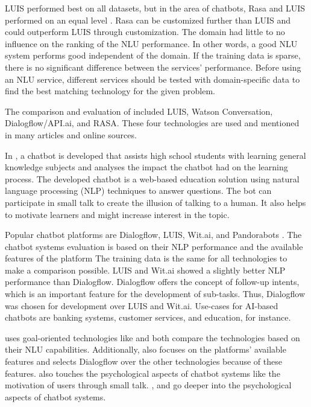 LUIS performed best on all datasets, but in the area of chatbots, Rasa and LUIS performed on an equal level \cite{braunEvaluatingNLU}.
Rasa can be customized further than LUIS and could outperform LUIS through customization. 
The domain had little to no influence on the ranking of the NLU performance.
In other words, a good NLU system performs good independent of the domain.
If the training data is sparse, there is no significant difference between the services' performance. 
Before using an NLU service, different services should be tested with domain-specific data to find the best matching technology for the given problem.

The comparison and evaluation of \citet{braunEvaluatingNLU} included LUIS, Watson Conversation, Dialogflow/API.ai, and RASA.
These four technologies are used and mentioned in many articles and online sources. 

In \citet{dutta2017developing}, a chatbot is developed that assists high school students with learning general knowledge subjects and analyses the impact the chatbot had on the learning process.
The developed chatbot is a web-based education solution using natural language processing (NLP) techniques to answer questions.
The bot can participate in small talk to create the illusion of talking to a human.
It also helps to motivate learners and might increase interest in the topic.

Popular chatbot platforms are Dialogflow, LUIS, Wit.ai, and Pandorabots \cite{dutta2017developing}.
The chatbot systems evaluation is based on their NLP performance and the available features of the platform
The training data is the same for all technologies to make a comparison possible. 
LUIS and Wit.ai showed a slightly better NLP performance than Dialogflow.
Dialogflow offers the concept of follow-up intents, which is an important feature for the development of sub-tasks.
Thus, Dialogflow was chosen for development over LUIS and Wit.ai.
Use-cases for AI-based chatbots are banking systems, customer services, and education, for instance.

\citet{dutta2017developing} uses goal-oriented technologies like \citet{braunEvaluatingNLU} and both compare the technologies based on their NLU capabilities.
Additionally, \citet{dutta2017developing} also focuses on the platforms' available features and selects Dialogflow over the other technologies because of these features.
\citet{dutta2017developing} also touches the psychological aspects of chatbot systems like the motivation of users through small talk. 
\citet{GO2019304, brandtzaeg2018chatbots}, and \citet{folstad2017chatbots} go deeper into the psychological aspects of chatbot systems.

